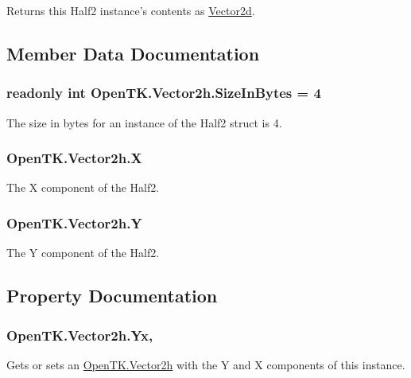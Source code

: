 Returns this Half2 instance's contents as \hyperlink{struct_open_t_k_1_1_vector2d}{Vector2d}. 



\subsection{Member Data Documentation}
\hypertarget{struct_open_t_k_1_1_vector2h_a3499ae9dc291a6ddc6ccee66e06a4cb2}{
\subsubsection[{Size\-In\-Bytes}]{\setlength{\rightskip}{0pt plus 5cm}readonly int Open\-T\-K.\-Vector2h.\-Size\-In\-Bytes = 4\hspace{0.3cm}{\ttfamily [static]}}}\label{struct_open_t_k_1_1_vector2h_a3499ae9dc291a6ddc6ccee66e06a4cb2}


The size in bytes for an instance of the Half2 struct is 4.

\hypertarget{struct_open_t_k_1_1_vector2h_a40362fcbff82e522ff2fd6348a467fe4}{
\subsubsection[{X}]{ Open\-T\-K.\-Vector2h.\-X}}\label{struct_open_t_k_1_1_vector2h_a40362fcbff82e522ff2fd6348a467fe4}


The X component of the Half2.

\hypertarget{struct_open_t_k_1_1_vector2h_ac6224ec322ee311b9f7173c5c2cf0f34}{
\subsubsection[{Y}]{ Open\-T\-K.\-Vector2h.\-Y}}\label{struct_open_t_k_1_1_vector2h_ac6224ec322ee311b9f7173c5c2cf0f34}


The Y component of the Half2.



\subsection{Property Documentation}
\hypertarget{struct_open_t_k_1_1_vector2h_a74058642879f307742558b0a8d8b362e}{
\subsubsection[{Yx}]{ Open\-T\-K.\-Vector2h.\-Yx\hspace{0.3cm}{\ttfamily [get]}, {\ttfamily [set]}}}\label{struct_open_t_k_1_1_vector2h_a74058642879f307742558b0a8d8b362e}


Gets or sets an \hyperlink{struct_open_t_k_1_1_vector2h}{Open\-T\-K.\-Vector2h} with the Y and X components of this instance. 

